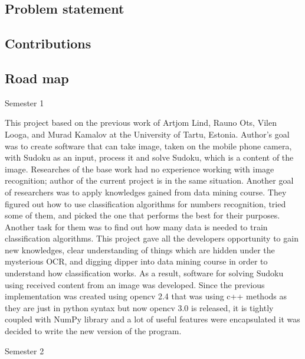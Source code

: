 \documentclass[../main]{subfiles}
\begin{document}

\subsection{Problem statement}

\subsection{Contributions}

\subsection{Road map}

Semester 1

This project based on the previous work of Artjom Lind, Rauno Ots, Vilen Looga, and Murad Kamalov at the University of Tartu, Estonia. Author’s goal was to create software that can take image, taken on the mobile phone camera, with Sudoku as an input, process it and solve Sudoku, which is a content of the image. Researches of the base work had no experience working with image recognition; author of the current project is in the same situation. Another goal of researchers was to apply knowledges gained from data mining course. They figured out how to use classification algorithms for numbers recognition, tried some of them, and picked the one that performs the best for their purposes. Another task for them was to find out how many data is needed to train classification algorithms. This project gave all the developers opportunity to gain new knowledges, clear understanding of things which are hidden under the mysterious OCR, and digging dipper into data mining course in order to understand how classification works. As a result, software for solving Sudoku using received content from an image was developed. Since the previous implementation was created using opencv 2.4 that was using c++ methods as they are just in python syntax but now opencv 3.0 is released, it is tightly coupled with NumPy library and a lot of useful features were encapsulated it was decided to write the new version of the program.

Semester 2
\end{document}
